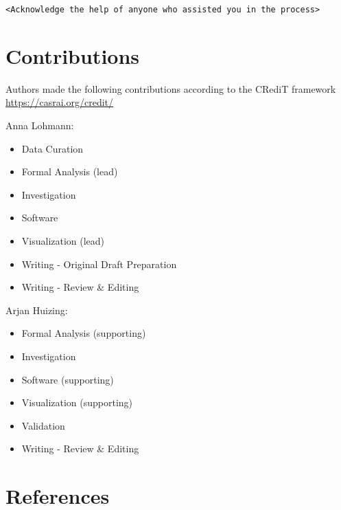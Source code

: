 \documentclass[10,a4paperpaper,]{article}
\begin{document}
\texttt{\textless{}Acknowledge\ the\ help\ of\ anyone\ who\ assisted\ you\ in\ the\ process\textgreater{}}

\section{Contributions}

Authors made the following contributions according to the CRediT
framework \url{https://casrai.org/credit/}

Anna Lohmann:

\begin{itemize}
\tightlist
\item
  Data Curation\\
\item
  Formal Analysis (lead)\\
\item
  Investigation\\
\item
  Software\\
\item
  Visualization (lead)\\
\item
  Writing - Original Draft Preparation\\
\item
  Writing - Review \& Editing
\end{itemize}

Arjan Huizing:

\begin{itemize}
\tightlist
\item
  Formal Analysis (supporting)\\
\item
  Investigation\\
\item
  Software (supporting)\\
\item
  Visualization (supporting)\\
\item
  Validation\\
\item
  Writing - Review \& Editing
\end{itemize}

\newpage

\section*{References}
\begingroup
\hphantom{x}
\setlength{\parindent}{-0.5in}
\setlength{\leftskip}{0.5in}
\end{document}
